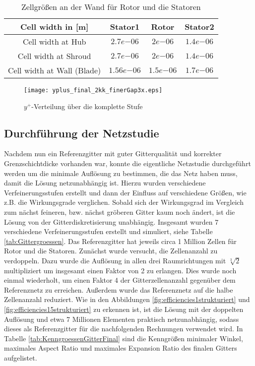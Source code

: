 \begin{table}[H]
\centering
\begin{tabular}[t]{cccc}
\toprule
 Cell width in [m] & Stator1 & Rotor & Stator2  \\
\midrule
Cell width at Hub & $2.7e{-06}$ & $2e{-06}$ & $1.4e{-06}$\\
Cell width at Shroud & $2.7e{-06}$ & $2e{-06}$ & $1.4e{-06}$ \\
Cell width at Wall (Blade) & $1.56e{-06}$ & $1.5e{-06}$ & $1.7e{-06}$ \\
\bottomrule
\end{tabular}
\caption{Zellgrößen an der Wand für Rotor und die Statoren} \label{cellWidths}
\end{table}

\begin{figure}[H]
	\centering
    
	\texttt{[image: yplus\_final\_2kk\_finerGap3x.eps]}
	\caption{$y^+$-Verteilung über die komplette Stufe} \label{imgYplusWerte}
\end{figure}

\subsection{Durchführung der Netzstudie}

Nachdem nun ein Referenzgitter mit guter Gitterqualität und korrekter Grenzschichtdicke vorhanden war, konnte die eigentliche Netzstudie durchgeführt werden um die minimale Auflösung zu bestimmen, die das Netz haben muss, damit die Lösung netzunabhängig ist. Hierzu wurden verschiedene Verfeinerungsstufen erstellt und dann der Einfluss auf verschiedene Größen, wie z.B. die Wirkungsgrade verglichen. Sobald sich der Wirkungsgrad im Vergleich zum nächst feineren, bzw. nächst gröberen Gitter kaum noch ändert, ist die Lösung von der Gitterdiskretisierung unabhängig. 
Insgesamt wurden 7 verschiedene Verfeinerungsstufen erstellt und simuliert, siehe Tabelle \ref{tab:Gittergroessen}. Das Referenzgitter hat jeweils circa 1 Million Zellen für Rotor und die Statoren. Zunächst wurde versucht, die Zellenanzahl zu verdoppeln. Dazu wurde die Auflösung in allen drei Raumrichtungen mit $\sqrt[3]{2}$ multipliziert um insgesamt einen Faktor von 2 zu erlangen. Dies wurde noch einmal wiederholt, um einen Faktor 4 der Gitterzellenanzahl gegenüber dem Referenznetz zu erreichen. Außerdem wurde das Referenznetz auf die halbe Zellenanzahl reduziert. Wie in den Abbildungen \ref{fig:efficiencies1strukturiert} und  \ref{fig:efficiencies15strukturiert} zu erkennen ist, ist die Lösung mit der doppelten Auflösung und etwa 7 Millionen Elementen praktisch netzunabhängig, sodass dieses als Referenzgitter für die nachfolgenden Rechnungen verwendet wird. 
In Tabelle \ref{tab:KenngroessenGitterFinal}  sind die Kenngrößen minimaler Winkel, maximales Aspect Ratio und maximales Expansion Ratio des finalen Gitters aufgelistet.

